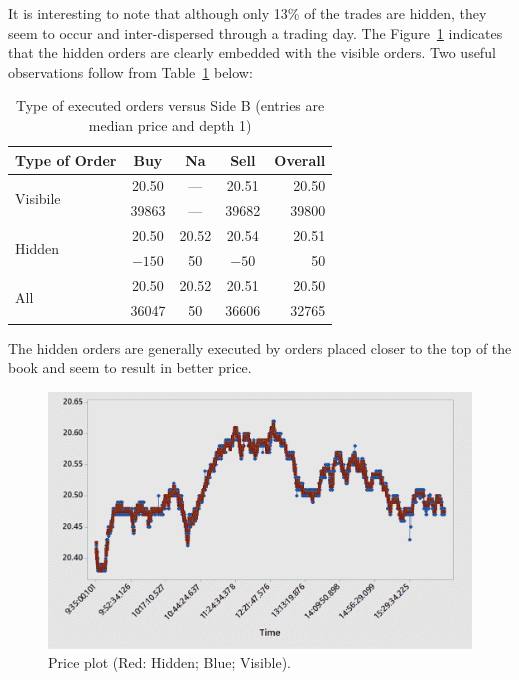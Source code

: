 It is interesting to note that although only 13\% of the trades are hidden, they seem to occur and inter-dispersed through a trading day. The Figure~\ref{fig:priceplothidvis} indicates that the hidden orders are clearly embedded with the visible orders. Two useful observations follow from Table~\ref{tab:typeexc} below:
	\begin{table}[!ht]
	\centering
	\caption{Type of executed orders versus Side B (entries are median price and depth 1)\label{tab:typeexc}}
	\begin{tabular}{l | ccc| r}
	Type of Order & Buy & Na & Sell & Overall \\ \hline
	\multirow{2}{*}{Visibile} & 20.50 & --- & 20.51 & 20.50 \\
	& 39863 & --- & 39682 & 39800 \\
	\multirow{2}{*}{Hidden} & 20.50 & 20.52 & 20.54 & 20.51 \\
	& $-150$ & 50 & $-50$ & 50 \\ \hline
	\multirow{2}{*}{All} & 20.50 & 20.52 & 20.51 & 20.50 \\
	& 36047 & 50 & 36606 & 32765
	\end{tabular}
	\end{table}
The hidden orders are generally executed by orders placed closer to the top of the book and seem to result in better price.
	\begin{figure}[!ht]
	\centering
	\includegraphics[width=\textwidth]{chapters/chapter_trade_data_models/figures/priceplot.png}
	\caption{Price plot (Red: Hidden; Blue; Visible).\label{fig:priceplothidvis}}
	\end{figure}



